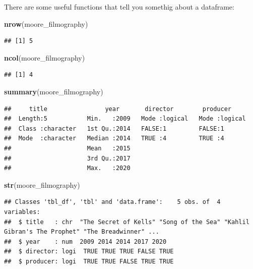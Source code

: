 \documentclass[
]{book}
\newenvironment{Shaded}{\begin{snugshade}}{\end{snugshade}}
\newcommand{\KeywordTok}[1]{\textcolor[rgb]{0.13,0.29,0.53}{\textbf{#1}}}
\newcommand{\NormalTok}[1]{#1}
\begin{document}
There are some useful functions that tell you somethig about a dataframe:

\begin{Shaded}
\begin{Highlighting}[]
\KeywordTok{nrow}\NormalTok{(moore_filmography)}
\end{Highlighting}
\end{Shaded}

\begin{verbatim}
## [1] 5
\end{verbatim}

\begin{Shaded}
\begin{Highlighting}[]
\KeywordTok{ncol}\NormalTok{(moore_filmography)}
\end{Highlighting}
\end{Shaded}

\begin{verbatim}
## [1] 4
\end{verbatim}

\begin{Shaded}
\begin{Highlighting}[]
\KeywordTok{summary}\NormalTok{(moore_filmography)}
\end{Highlighting}
\end{Shaded}

\begin{verbatim}
##     title                year       director        producer      
##  Length:5           Min.   :2009   Mode :logical   Mode :logical  
##  Class :character   1st Qu.:2014   FALSE:1         FALSE:1        
##  Mode  :character   Median :2014   TRUE :4         TRUE :4        
##                     Mean   :2015                                  
##                     3rd Qu.:2017                                  
##                     Max.   :2020
\end{verbatim}

\begin{Shaded}
\begin{Highlighting}[]
\KeywordTok{str}\NormalTok{(moore_filmography)}
\end{Highlighting}
\end{Shaded}

\begin{verbatim}
## Classes 'tbl_df', 'tbl' and 'data.frame':    5 obs. of  4 variables:
##  $ title   : chr  "The Secret of Kells" "Song of the Sea" "Kahlil Gibran's The Prophet" "The Breadwinner" ...
##  $ year    : num  2009 2014 2014 2017 2020
##  $ director: logi  TRUE TRUE TRUE FALSE TRUE
##  $ producer: logi  TRUE TRUE FALSE TRUE TRUE
\end{verbatim}
\end{document}
